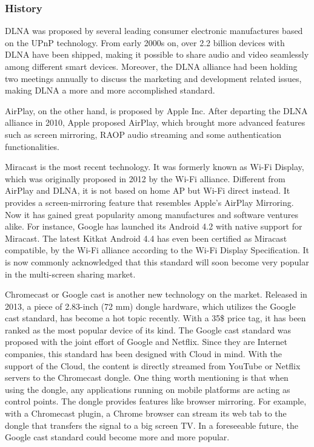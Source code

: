 \subsubsection{History\label{2_3_1}} 
DLNA was proposed by several leading consumer electronic manufactures based on
the UPnP technology. From early 2000s on, over 2.2 billion devices with DLNA have been shipped, 
making it possible to share audio and video seamlessly among different smart devices. Moreover, the DLNA alliance had been holding two meetings annually to discuss the marketing and development related issues, making DLNA a more and more accomplished standard.

AirPlay, on the other hand, is proposed by Apple Inc. After departing the DLNA alliance in 2010, Apple proposed AirPlay, which brought more advanced features such as screen mirroring, RAOP audio streaming and some authentication functionalities.

Miracast is the most recent technology. It was formerly known as Wi-Fi Display,
which was originally proposed in 2012 by the Wi-Fi alliance. Different from
AirPlay and DLNA, it is not based on home AP but Wi-Fi direct instead. It
provides a screen-mirroring feature that resembles Apple's AirPlay Mirroring.
Now it has gained great popularity among manufactures and software ventures
alike. For instance, Google has launched its Android 4.2 with native support
for Miracast. The latest Kitkat Android 4.4 has even been certified as Miracast
compatible, by the Wi-Fi alliance according to the Wi-Fi Display Specification.
It is now commonly acknowledged that this standard will soon become very
popular in the multi-screen sharing market.

Chromecast or Google cast is another new technology on the market. Released in
2013, a piece of 2.83-inch (72 mm) dongle hardware, which utilizes the Google
cast standard, has become a hot topic recently. With a 35\$ price tag, it has
been ranked as the most popular device of its kind. The Google cast standard
was proposed with the joint effort of Google and Netflix. Since they are
Internet companies, this standard has been designed with Cloud in mind. With
the support of the Cloud, the content is directly streamed from YouTube or
Netflix servers to the Chromecast dongle. One thing worth mentioning is that when using
the dongle, any applications running on mobile platforms are acting as
control points. The dongle provides features like browser mirroring. For
example, with a Chromecast plugin, a Chrome browser can stream its web tab to
the dongle that transfers the signal to a big screen TV. In a foreseeable
future, the Google cast standard could become more and more popular.
